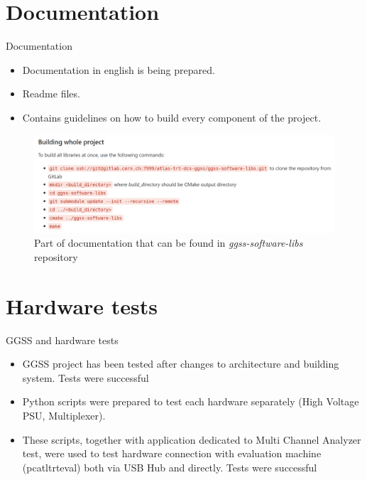 \documentclass[10pt]{beamer}
\begin{document}
\section {Documentation}

\begin{frame}{Documentation}
\begin{itemize}
  \item Documentation in english is being prepared.
  \item Readme files.
  \item Contains guidelines on how to build every component of the project.
\end{itemize}
\begin{figure}
    \centering
    \includegraphics[width=\linewidth]{resources/documentation}
    \caption{Part of documentation that can be found in \textit{ggss-software-libs} repository}
\end{figure}
\end{frame}

\section {Hardware tests}

\begin{frame}{GGSS and hardware tests}
\begin{itemize}
	\item GGSS project has been tested after changes to architecture and building system. Tests were \color{darkgreen}successful\color{black}
	\item Python scripts were prepared to test each hardware separately (High Voltage PSU, Multiplexer). 
	\item These scripts, together with application dedicated to Multi Channel Analyzer test, were used to test hardware connection with evaluation machine (pcatltrteval) both via USB Hub and directly. Tests were \color{darkgreen}successful\color{black}
\end{itemize}
\end{frame}
\end{document}
